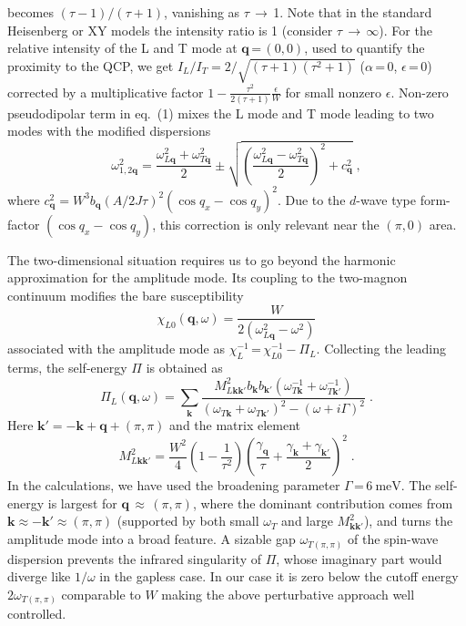 \documentclass[twocolumn,prb,aps,showpacs]{revtex4-1}
\newcommand{\vc}[1]{\boldsymbol{#1}}
\begin{document}
becomes $(\tau-1)/(\tau+1)$, vanishing as $\tau$\,$\rightarrow$\,1. Note that in the standard Heisenberg or XY models the intensity ratio is 1 (consider $\tau$\,$\rightarrow$\,$\infty$). For the relative intensity 
of the L and T mode at $\vc q$\,=\,$(0,0)$, used to quantify the proximity 
to the QCP, we get $I_L/I_T=2/\sqrt{(\tau+1)(\tau^2+1)}$ ($\alpha$\,=\,$0$, 
$\epsilon$\,=\,0) corrected by a multiplicative factor 
$1-\frac{\tau^2}{2(\tau+1)}\frac{\epsilon}{W}$ for small nonzero $\epsilon$.
Non-zero pseudodipolar term in eq.~(1) mixes the L mode and T mode 
leading to two modes with the modified dispersions
\begin{equation}
\omega_{1,2\vc q}^2 = \frac{\omega_{L\vc q}^2+\omega_{T\vc q}^2}2 
\pm \sqrt{ \left(\frac{\omega_{L\vc q}^2-\omega_{T\vc q}^2}2\right)^2 
+ c_{\vc q}^2 } \;,
\end{equation}
where $c_{\vc q}^2=W^3 b_{\vc q} (A/2J\tau)^2 (\cos q_x-\cos q_y)^2$.
Due to the $d$-wave type form-factor $(\cos q_x-\cos q_y)$, this 
correction is only relevant near the $(\pi,0)$ area.



The two-dimensional situation requires us to go beyond the harmonic
approximation for the amplitude mode. Its coupling to the two-magnon continuum
modifies the bare susceptibility
\begin{equation}
\chi_{L0}(\vc q,\omega)=\frac{W}{2(\omega_{L\vc q}^2-\omega^2)}
\end{equation}
associated with the amplitude mode as $\chi_L^{-1}$\,=\,$\chi_{L0}^{-1}-\Pi_L$. 
Collecting the leading terms, the self-energy $\Pi$ is obtained as
\begin{equation}
\Pi_L(\vc q,\omega) = \sum_{\vc k}
\frac{ M^2_{L\vc k\vc k'} b_{\vc k}b_{\vc k'} 
(\omega^{-1}_{T\vc k}+\omega^{-1}_{T\vc k'}) }
{(\omega_{T\vc k}+\omega_{T\vc k'})^2-(\omega+i\Gamma)^2} \;.
\end{equation}
Here $\vc k'=-\vc k+\vc q+(\pi,\pi)$ and the matrix element
\begin{equation}
M^2_{L\vc k\vc k'} = \frac{W^2}4 \left(1-\frac1{\tau^2}\right) 
\left( \frac{\gamma_{\vc q}}{\tau} 
      +\frac{\gamma_{\vc k}+\gamma_{\vc k'}}2 \right)^2 \;.
\end{equation}
In the calculations, we have used the broadening parameter 
$\Gamma$\,=\,$6\:\mathrm{meV}$.
The self-energy is largest for $\vc q$\,$\approx$\,$(\pi,\pi)$, where the dominant
contribution comes from $\vc k\approx -\vc k' \approx (\pi,\pi)$ (supported
by both small $\omega_T$ and large $M^2_{\vc k\vc k'}$), and turns 
the amplitude mode into a broad feature. 
A sizable gap $\omega_{T(\pi,\pi)}$ of the spin-wave dispersion prevents the infrared
singularity of $\Pi$, whose imaginary part would diverge like $1/\omega$ in
the gapless case. In our case it is zero below the cutoff energy 
$2\omega_{T(\pi,\pi)}$ comparable to $W$ making the above perturbative
approach well controlled.
\end{document}
